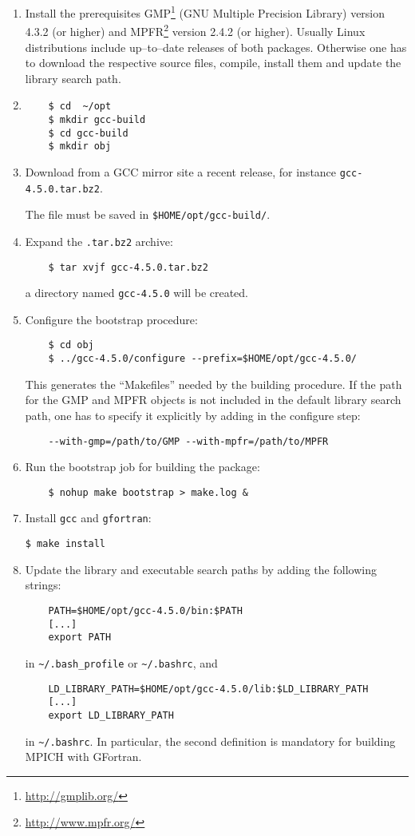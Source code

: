 \documentclass[a4paper,12pt]{article}%
\begin{document}
\begin{enumerate}
\item Install the prerequisites GMP\footnote{\url{http://gmplib.org/}}
  (GNU Multiple Precision Library) version 4.3.2 (or higher) and
  MPFR\footnote{\url{http://www.mpfr.org/}} version 2.4.2 (or
  higher). Usually Linux distributions include up--to--date releases
  of both packages. Otherwise one has to download the respective source
  files, compile, install them and update the library search path.
\item 
  \begin{Verbatim}
    $ cd  ~/opt
    $ mkdir gcc-build
    $ cd gcc-build
    $ mkdir obj
  \end{Verbatim}
\item Download from a GCC mirror site a recent release, for instance
      \verb+gcc-4.5.0.tar.bz2+. 

  The file must be saved in \verb+$HOME/opt/gcc-build/+.
\item Expand the \verb+.tar.bz2+ archive:
  \begin{Verbatim}
    $ tar xvjf gcc-4.5.0.tar.bz2
  \end{Verbatim}
  a directory named \verb+gcc-4.5.0+ will be created.
\item Configure the bootstrap procedure:
  \begin{Verbatim}
    $ cd obj
    $ ../gcc-4.5.0/configure --prefix=$HOME/opt/gcc-4.5.0/
  \end{Verbatim}
  This generates the ``Makefiles'' needed by the building procedure.
  If the path for the GMP and MPFR objects is not included in the
  default library search path, one has to specify it explicitly by
  adding in the configure step:
  \begin{Verbatim}
    --with-gmp=/path/to/GMP --with-mpfr=/path/to/MPFR
  \end{Verbatim}
\item Run the bootstrap job for building the package:
  \begin{Verbatim}
    $ nohup make bootstrap > make.log &
  \end{Verbatim}
\item Install \verb+gcc+ and \verb+gfortran+:
\begin{verbatim}
$ make install
\end{verbatim}
\item Update the library and executable search paths by adding the
  following strings:
  \begin{Verbatim}
    PATH=$HOME/opt/gcc-4.5.0/bin:$PATH
    [...]
    export PATH
  \end{Verbatim}
  in \verb+~/.bash_profile+ or \verb+~/.bashrc+, and
  \begin{Verbatim}
    LD_LIBRARY_PATH=$HOME/opt/gcc-4.5.0/lib:$LD_LIBRARY_PATH
    [...]
    export LD_LIBRARY_PATH
  \end{Verbatim}
  in \verb+~/.bashrc+. In particular, the second definition is
  mandatory for building MPICH with GFortran.
\end{enumerate}
\end{document}
